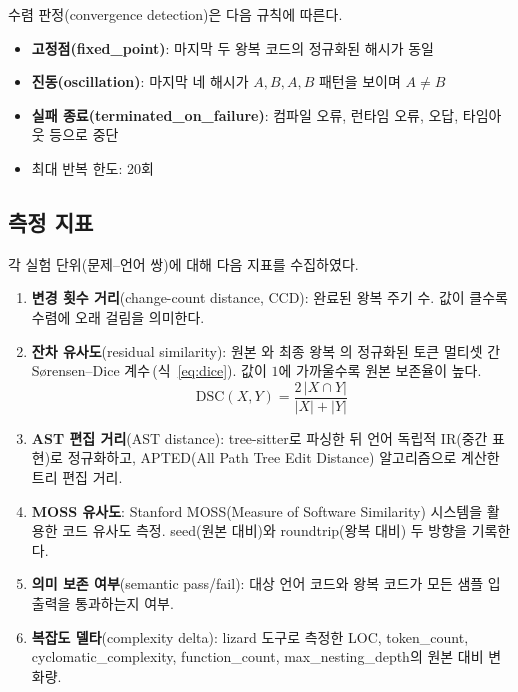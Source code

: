 수렴 판정(convergence detection)은 다음 규칙에 따른다.

\begin{itemize}[leftmargin=2em]
  \item \textbf{고정점(fixed\_point)}: 마지막 두 왕복 \cpp{} 코드의 정규화된 해시가 동일
  \item \textbf{진동(oscillation)}: 마지막 네 해시가 $A, B, A, B$ 패턴을 보이며 $A \neq B$
  \item \textbf{실패 종료(terminated\_on\_failure)}: 컴파일 오류, 런타임 오류, 오답,
    타임아웃 등으로 중단
  \item 최대 반복 한도: 20회
\end{itemize}

\subsection{측정 지표}\label{ssec:metrics}

각 실험 단위(문제--언어 쌍)에 대해 다음 지표를 수집하였다.

\begin{enumerate}[leftmargin=2em, label=\arabic*)]
  \item \textbf{변경 횟수 거리}(change-count distance, CCD):
    완료된 왕복 주기 수. 값이 클수록 수렴에 오래 걸림을 의미한다.

  \item \textbf{잔차 유사도}(residual similarity):
    원본 \cpp{}와 최종 왕복 \cpp{}의 정규화된 토큰 멀티셋 간
    S{\o}rensen--Dice 계수\,(식~\ref{eq:dice}).
    값이 $1$에 가까울수록 원본 보존율이 높다.
    \begin{equation}\label{eq:dice}
      \mathrm{DSC}(X,Y) = \frac{2\,|X \cap Y|}{|X| + |Y|}
    \end{equation}

  \item \textbf{AST 편집 거리}(AST distance):
    tree-sitter로 파싱한 뒤 언어 독립적 IR(중간 표현)로 정규화하고,
    APTED(All Path Tree Edit Distance) 알고리즘으로 계산한 트리 편집 거리.

  \item \textbf{MOSS 유사도}:
    Stanford MOSS(Measure of Software Similarity) 시스템을 활용한 코드 유사도
    측정. seed(원본 \cpp{} 대비)와 roundtrip(왕복 \cpp{} 대비) 두 방향을 기록한다.

  \item \textbf{의미 보존 여부}(semantic pass/fail):
    대상 언어 코드와 왕복 \cpp{} 코드가 모든 샘플 입출력을 통과하는지 여부.

  \item \textbf{복잡도 델타}(complexity delta):
    lizard 도구로 측정한 LOC, token\_count, cyclomatic\_complexity,
    function\_count, max\_nesting\_depth의 원본 대비 변화량.
\end{enumerate}

